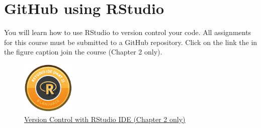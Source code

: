 \documentclass[letterpaper,9pt,twocolumn,twoside,printwatermark=false]{pinp}
\begin{document}
\section{GitHub using RStudio}\label{github-using-rstudio}

You will learn how to use RStudio to version control your code. All
assignments for this course must be submitted to a GitHub repository.
Click on the link the in the figure caption join the course (Chapter 2
only).

\begin{figure}[H]
  \begin{center}
    \includegraphics[width=1in, height=1in]{../../images/rstudio_ide_2.png} 
  \end{center}
  \caption{\href{https://www.datacamp.com/courses/working-with-the-rstudio-ide-part-2}{Version Control with RStudio IDE (Chapter 2 only)}}\label{fig}
\end{figure}





\end{document}
